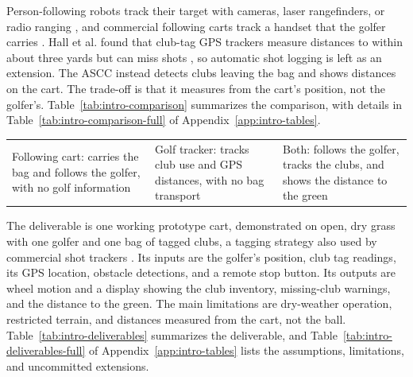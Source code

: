 Person-following robots track their target with cameras, laser rangefinders, or radio ranging \cite{islam2019personFollowing}, and commercial following carts track a handset that the golfer carries \cite{stewartQFollow}. Hall et al. found that club-tag \ac{GPS} trackers measure distances to within about three yards but can miss shots \cite{hall2025golfGps}, so automatic shot logging is left as an extension. The \ac{ASCC} instead detects clubs leaving the bag and shows distances on the cart. The trade-off is that it measures from the cart's position, not the golfer's. Table~\ref{tab:intro-comparison} summarizes the comparison, with details in Table~\ref{tab:intro-comparison-full} of Appendix~\ref{app:intro-tables}.

\begin{TableBlock}
\small
{}\label{tab:intro-comparison}
\begin{tabularx}{\linewidth}{@{}YYY@{}}
 &  &  \\
\midrule
Following cart: carries the bag and follows the golfer, with no golf information & Golf tracker: tracks club use and GPS distances, with no bag transport & Both: follows the golfer, tracks the clubs, and shows the distance to the green \\
\bottomrule
\end{tabularx}
\end{TableBlock}


The deliverable is one working prototype cart, demonstrated on open, dry grass with one golfer and one bag of tagged clubs, a tagging strategy also used by commercial shot trackers \cite{arccosSmartSensors}. Its inputs are the golfer's position, club tag readings, its \ac{GPS} location, obstacle detections, and a remote stop button. Its outputs are wheel motion and a display showing the club inventory, missing-club warnings, and the distance to the green. The main limitations are dry-weather operation, restricted terrain, and distances measured from the cart, not the ball. Table~\ref{tab:intro-deliverables} summarizes the deliverable, and Table~\ref{tab:intro-deliverables-full} of Appendix~\ref{app:intro-tables} lists the assumptions, limitations, and uncommitted extensions.

